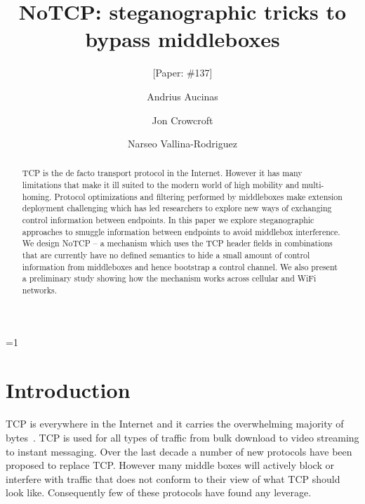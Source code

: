 \documentclass{sig-alternate-10pt}
\def\anon{1}        %
\begin{document}
\date{}


\title{NoTCP: steganographic tricks to bypass middleboxes}
\ifnum\anon=1
\author{[Paper: \#137]}%
\else
{}
\author{
\alignauthor Andrius Aucinas\\
\and
\alignauthor Jon Crowcroft\\
\and
\alignauthor Narseo Vallina-Rodriguez\\
}
\fi

    
\maketitle
\begin{abstract}
TCP is the de facto transport protocol in the Internet. However it has many limitations that make it ill suited to the modern world of high mobility and multi-homing. Protocol optimizations and filtering performed by middleboxes make extension deployment challenging which has led researchers to explore new ways of exchanging control information between endpoints. In this paper we explore steganographic approaches to smuggle information between endpoints to avoid middlebox interference. We design NoTCP -- a mechanism which uses the TCP header fields in combinations that are currently have no defined semantics to hide a small amount of control information from middleboxes and hence bootstrap a control channel. We also present a preliminary study showing how the mechanism works across cellular and WiFi networks.
\end{abstract} 

\section{Introduction}
\label{section:intro}

TCP is everywhere in the Internet and it carries the overwhelming majority of bytes~\cite{John:2007dv}. TCP is used for all types of traffic from bulk download to video streaming to instant messaging. Over the last decade a number of new protocols have been proposed to replace TCP. However many middle boxes will actively block or interfere with traffic that does not conform to their view of what TCP should look like. Consequently few of these protocols have found any leverage.
\end{document}
